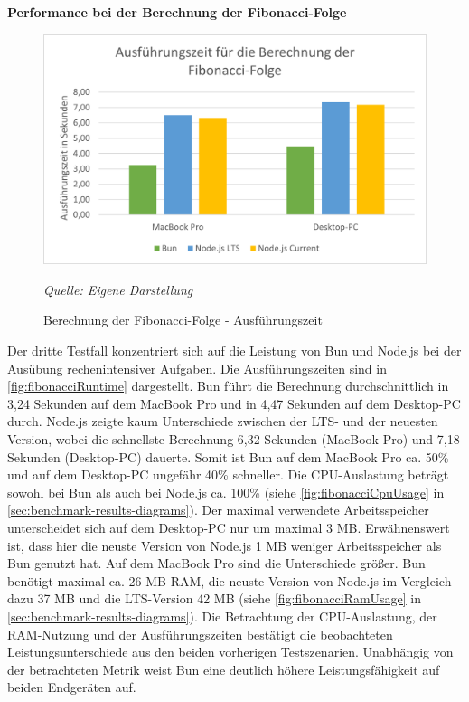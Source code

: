 \noindent
\textbf{Performance bei der Berechnung der Fibonacci-Folge}
\begin{figure}[h!]
	\centering
	\includegraphics[width=\linewidth]{./images/fibonacciRuntime.png}
	\caption{Berechnung der Fibonacci-Folge - Ausführungszeit}
	\label{fig:fibonacciRuntime}
	\textit{Quelle: Eigene Darstellung}
\end{figure}


\noindent
Der dritte Testfall konzentriert sich auf die Leistung von Bun und Node.js bei der Ausübung rechenintensiver Aufgaben. Die Ausführungszeiten sind in \autoref{fig:fibonacciRuntime} dargestellt. Bun führt die Berechnung durchschnittlich in 3,24 Sekunden auf dem MacBook Pro und in 4,47 Sekunden auf dem Desktop-PC durch. Node.js zeigte kaum Unterschiede zwischen der LTS- und der neuesten Version, wobei die schnellste Berechnung 6,32 Sekunden (MacBook Pro) und 7,18 Sekunden (Desktop-PC) dauerte. Somit ist Bun auf dem MacBook Pro ca. 50\% und auf dem Desktop-PC ungefähr 40\% schneller. Die CPU-Auslastung beträgt sowohl bei Bun als auch bei Node.js ca. 100\% (siehe \autoref{fig:fibonacciCpuUsage} in \autoref{sec:benchmark-results-diagrams}). Der maximal verwendete Arbeitsspeicher unterscheidet sich auf dem Desktop-PC nur um maximal 3 MB. Erwähnenswert ist, dass hier die neuste Version von Node.js 1 MB weniger Arbeitsspeicher als Bun genutzt hat. Auf dem MacBook Pro sind die Unterschiede größer. Bun benötigt maximal ca. 26 MB RAM, die neuste Version von Node.js im Vergleich dazu 37 MB und die LTS-Version 42 MB (siehe \autoref{fig:fibonacciRamUsage} in \autoref{sec:benchmark-results-diagrams}).\newline
Die Betrachtung der CPU-Auslastung, der RAM-Nutzung und der Ausführungszeiten bestätigt die beobachteten Leistungsunterschiede aus den beiden vorherigen Testszenarien. Unabhängig von der betrachteten Metrik weist Bun eine deutlich höhere Leistungsfähigkeit auf beiden Endgeräten auf.

